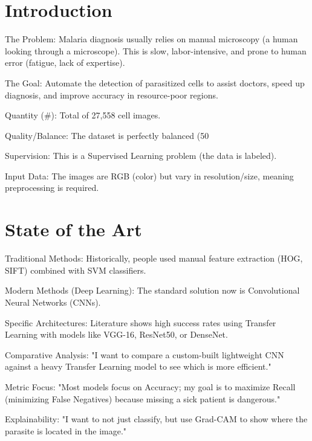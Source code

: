 
\chapter{Introduction}
The Problem: Malaria diagnosis usually relies on manual microscopy (a human looking through a microscope). This is slow, labor-intensive, and prone to human error (fatigue, lack of expertise).

The Goal: Automate the detection of parasitized cells to assist doctors, speed up diagnosis, and improve accuracy in resource-poor regions.

Quantity (#): Total of 27,558 cell images.

Quality/Balance: The dataset is perfectly balanced (50%

Supervision: This is a Supervised Learning problem (the data is labeled).

Input Data: The images are RGB (color) but vary in resolution/size, meaning preprocessing is required.

\chapter{State of the Art}

Traditional Methods: Historically, people used manual feature extraction (HOG, SIFT) combined with SVM classifiers.

Modern Methods (Deep Learning): The standard solution now is Convolutional Neural Networks (CNNs).

Specific Architectures: Literature shows high success rates using Transfer Learning with models like VGG-16, ResNet50, or DenseNet.

Comparative Analysis: "I want to compare a custom-built lightweight CNN against a heavy Transfer Learning model to see which is more efficient."

Metric Focus: "Most models focus on Accuracy; my goal is to maximize Recall (minimizing False Negatives) because missing a sick patient is dangerous."

Explainability: "I want to not just classify, but use Grad-CAM to show where the parasite is located in the image."

